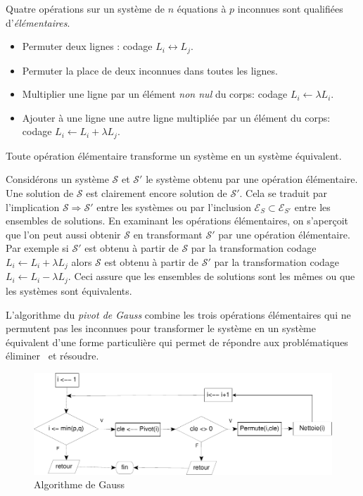 \begin{defi}
 Quatre opérations sur un système de $n$ équations à $p$ inconnues sont qualifiées d'\emph{élémentaires}.
\begin{itemize}
 \item Permuter deux lignes : codage $L_i\leftrightarrow L_j$.
 \item Permuter la place de deux inconnues dans toutes les lignes.
 \item Multiplier une ligne par un élément \emph{non nul} du corps: codage $L_i\leftarrow \lambda L_i$.
 \item Ajouter à une ligne une autre ligne multipliée par un élément du corps: codage $L_i\leftarrow L_i + \lambda L_j$.
\end{itemize}
\end{defi}
\begin{prop}
 Toute opération élémentaire transforme un système en un système équivalent.
\end{prop}
\begin{demo}
 Considérons un système $\mathcal{S}$ et $\mathcal{S}'$ le système obtenu par une opération élémentaire. Une solution de $\mathcal{S}$ est clairement encore solution de $\mathcal{S}'$. Cela se traduit par l'implication $\mathcal{S} \Rightarrow \mathcal{S}'$ entre les systèmes ou par l'inclusion $\mathcal{E}_S \subset \mathcal{E}_{S'}$ entre les ensembles de solutions.\newline
 En examinant les opérations élémentaires, on s'aperçoit que l'on peut aussi obtenir $\mathcal{S}$ en transformant $\mathcal{S}'$ par une opération élémentaire.\newline
 Par exemple si $\mathcal{S}'$ est obtenu à partir de $\mathcal{S}$ par la transformation codage $L_i\leftarrow L_i + \lambda L_j$ alors $\mathcal{S}$ est obtenu à partir de $\mathcal{S}'$ par la transformation codage $L_i\leftarrow L_i - \lambda L_j$.\newline
 Ceci assure que les ensembles de solutions sont les mêmes ou que les systèmes sont équivalents.
\end{demo}
L'algorithme du \emph{pivot de Gauss} combine les trois opérations élémentaires qui ne permutent pas les inconnues pour transformer le système en un système équivalent d'une forme particulière qui permet de répondre aux problématiques \og éliminer\fg~ et \og résoudre\fg.
\begin{figure}[h!t]
 \centering
 \includegraphics{C2234_1.pdf}
 \caption{Algorithme de Gauss}
 \label{fig:C2234_1}
\end{figure}

